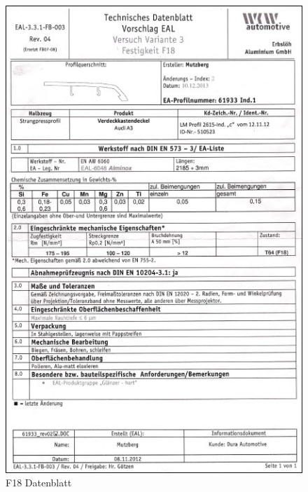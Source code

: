 \documentclass[12pt,a4paper,parskip]{scrartcl}
\begin{document}
\begin{figure}[hbtp]
\centering
\includegraphics[width=1\textwidth]{F18Datenblatt.jpg}
\caption{F18 Datenblatt}
\end{figure}
\end{document}
